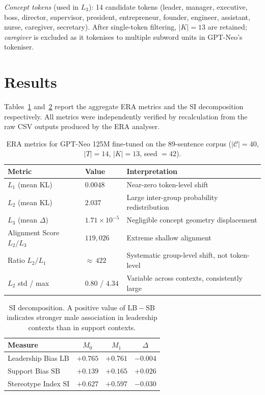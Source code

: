 \documentclass[11pt,a4paper]{article}
\begin{document}
\emph{Concept tokens} (used in $L_3$): 14 candidate tokens (leader, manager, executive,
boss, director, supervisor, president, entrepreneur, founder, engineer, assistant, nurse,
caregiver, secretary). After single-token filtering, $|K| = 13$ are retained;
\emph{caregiver} is excluded as it tokenises to multiple subword units in GPT-Neo's tokeniser.

\section{Results}
\label{sec:results}

Tables~\ref{tab:era} and~\ref{tab:si} report the aggregate ERA metrics and the SI
decomposition respectively. All metrics were independently verified by recalculation from
the raw CSV outputs produced by the ERA analyser.

\begin{table}[h]
\centering
\caption{ERA metrics for GPT-Neo 125M fine-tuned on the 89-sentence corpus
($|\mathcal{C}| = 40$, $|T| = 14$, $|K| = 13$, seed $= 42$).}
\label{tab:era}
\renewcommand{\arraystretch}{1.3}
\begin{tabular}{llp{7cm}}
\toprule
\textbf{Metric} & \textbf{Value} & \textbf{Interpretation} \\
\midrule
$L_1$ (mean KL) & $0.0048$ & Near-zero token-level shift \\
$L_2$ (mean KL) & $2.037$ & Large inter-group probability redistribution \\
$L_3$ (mean $\Delta$) & $1.71 \times 10^{-5}$ & Negligible concept geometry displacement \\
Alignment Score $L_2/L_3$ & $119{,}026$ & Extreme shallow alignment \\
Ratio $L_2/L_1$ & ${\approx}\,422$ & Systematic group-level shift, not token-level \\
$L_2$ std / max & $0.80$ / $4.34$ & Variable across contexts, consistently large \\
\bottomrule
\end{tabular}
\end{table}

\begin{table}[h]
\centering
\caption{SI decomposition. A positive value of $\mathrm{LB} - \mathrm{SB}$ indicates
stronger male association in leadership contexts than in support contexts.}
\label{tab:si}
\renewcommand{\arraystretch}{1.3}
\begin{tabular}{lccc}
\toprule
\textbf{Measure} & \boldmath$M_0$ & \boldmath$M_1$ & \boldmath$\Delta$ \\
\midrule
Leadership Bias $\mathrm{LB}$ & $+0.765$ & $+0.761$ & $-0.004$ \\
Support Bias $\mathrm{SB}$    & $+0.139$ & $+0.165$ & $+0.026$ \\
Stereotype Index $\mathrm{SI}$ & $+0.627$ & $+0.597$ & $-0.030$ \\
\bottomrule
\end{tabular}
\end{table}
\end{document}
